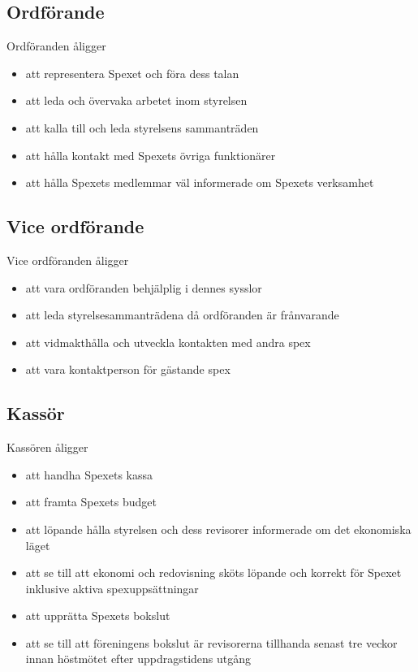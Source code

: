 \documentclass[a4paper]{article}
\begin{document}
\subsection{Ordförande}
Ordföranden åligger

\begin{itemize}
  \item att representera Spexet och föra dess talan
  \item att leda och övervaka arbetet inom styrelsen
  \item att kalla till och leda styrelsens sammanträden
  \item att hålla kontakt med Spexets övriga funktionärer
  \item att hålla Spexets medlemmar väl informerade om Spexets verksamhet
\end{itemize}

\subsection{Vice ordförande}
Vice ordföranden åligger

\begin{itemize}
  \item att vara ordföranden behjälplig i dennes sysslor
  \item att leda styrelsesammanträdena då ordföranden är frånvarande
  \item att vidmakthålla och utveckla kontakten med andra spex
  \item att vara kontaktperson för gästande spex
\end{itemize}

\subsection{Kassör}
Kassören åligger

\begin{itemize}
  \item att handha Spexets kassa
  \item att framta Spexets budget
  \item att löpande hålla styrelsen och dess revisorer informerade om det ekonomiska läget
  \item att se till att ekonomi och redovisning sköts löpande och korrekt för Spexet inklusive aktiva spexuppsättningar
  \item att upprätta Spexets bokslut
  \item att se till att föreningens bokslut är revisorerna tillhanda senast tre veckor innan höstmötet efter uppdragstidens utgång
\end{itemize}
\end{document}
